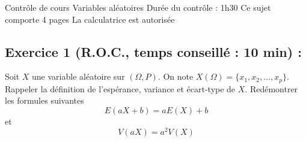 

\usepackage[c]{esvect}
\newcommand{\covec}[2]{\begin{pmatrix}#1 \\#2 \end{pmatrix}}


\center
\Large Contrôle de cours
\flushleft
\center
Variables aléatoires
\flushleft \normalsize
Durée du contrôle : 1h30\newline
Ce sujet comporte 4 pages\newline
La calculatrice est autorisée
\subsection*{Exercice 1 (R.O.C., temps conseillé : 10 min) : }
Soit $X$ une variable aléatoire sur $(\Omega,P)$. On note $X(\Omega) = \{x_1,x_2,\ldots,x_p\}$. Rappeler la définition de l'espérance, variance et écart-type de $X$. Redémontrer les formules suivantes $$E(aX+b) = aE(X)+b$$ et $$V(aX) = a^2V(X)$$
